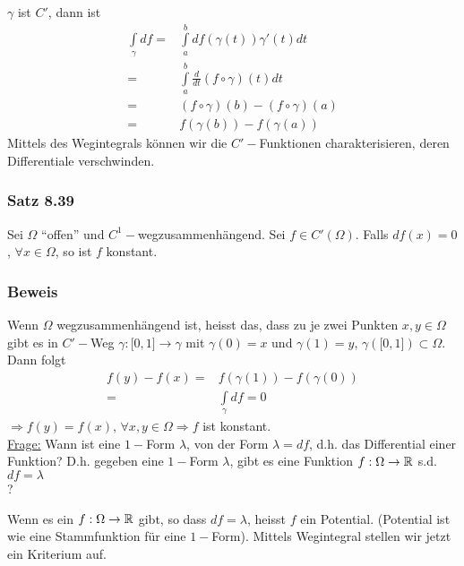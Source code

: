 \begin{enumerate}[\indent E1)]
$\gamma$ ist $C'$, dann ist
\begin{align*}
\int\limits_\gamma  {df}  = & \int\limits_a^b {df\left( {\gamma \left( t \right)} \right)\gamma '\left( t \right)dt} \\
\mathop  = & \int\limits_a^b {\frac{d}{{dt}}\left( {f \circ \gamma } \right)\left( t \right)dt}\\
 = &\left( {f \circ \gamma } \right)\left( b \right) - \left( {f \circ \gamma } \right)\left( a \right)\\
 = & f\left( {\gamma \left( b \right)} \right) - f\left( {\gamma \left( a \right)} \right)
\end{align*}
Mittels des Wegintegrals können wir die $C'-$Funktionen charakterisieren, deren Differentiale verschwinden.
\end{enumerate}

\subsubsection*{Satz 8.39}
Sei $\Omega$ ``offen'' und $C^1-$wegzusammenhängend. Sei $f\in C'\left(\Omega\right)$. Falls $df(x)=0$, $\forall x\in\Omega$, so ist $f$ konstant.
\subsubsection*{Beweis}
Wenn $\Omega$ wegzusammenhängend ist, heisst das, dass zu je zwei Punkten $x,y\in\Omega$ gibt es in $C'-$Weg $\gamma :\lbrack 0,1\rbrack\to\gamma$ mit $\gamma(0)=x$ und $\gamma(1)=y$, $\gamma\left(\lbrack 0,1\rbrack\right)\subset\Omega$. Dann folgt
\begin{align*}
f(y)-f(x)=& f\left(\gamma(1)\right)-f\left(\gamma(0)\right)\\
= &\int\limits_{\gamma} df = 0
\end{align*}
$\Rightarrow f(y)=f(x)$, $\forall x,y\in\Omega\Rightarrow f$ ist konstant.\\

\noindent\underline{Frage:} Wann ist eine $1-$Form $\lambda$, von der Form $\lambda = df$, d.h. das Differential einer Funktion? D.h. gegeben eine $1-$Form $\lambda$, gibt es eine Funktion $f:\Omega\to\mathbb{R}$ s.d. $df=\lambda$\\?

Wenn es ein $f:\Omega\to\mathbb{R}$ gibt, so dass $df=\lambda$, heisst $f$ ein Potential. (Potential ist wie eine Stammfunktion für eine $1-$Form). Mittels Wegintegral stellen wir jetzt ein Kriterium auf.

